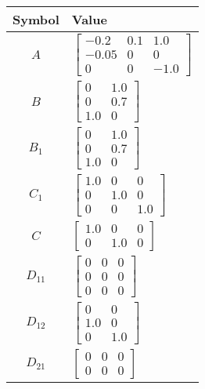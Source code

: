 \begin{tabular}{cl}
\hline
  Symbol  & Value                                                                                  \\
\hline
   $A$    & $\left[\begin{matrix}-0.2 & 0.1 & 1.0\\-0.05 & 0 & 0\\0 & 0 & -1.0\end{matrix}\right]$ \\
   $B$    & $\left[\begin{matrix}0 & 1.0\\0 & 0.7\\1.0 & 0\end{matrix}\right]$                     \\
 $B_{1}$  & $\left[\begin{matrix}0 & 1.0\\0 & 0.7\\1.0 & 0\end{matrix}\right]$                     \\
 $C_{1}$  & $\left[\begin{matrix}1.0 & 0 & 0\\0 & 1.0 & 0\\0 & 0 & 1.0\end{matrix}\right]$         \\
   $C$    & $\left[\begin{matrix}1.0 & 0 & 0\\0 & 1.0 & 0\end{matrix}\right]$                      \\
 $D_{11}$ & $\left[\begin{matrix}0 & 0 & 0\\0 & 0 & 0\\0 & 0 & 0\end{matrix}\right]$               \\
 $D_{12}$ & $\left[\begin{matrix}0 & 0\\1.0 & 0\\0 & 1.0\end{matrix}\right]$                       \\
 $D_{21}$ & $\left[\begin{matrix}0 & 0 & 0\\0 & 0 & 0\end{matrix}\right]$                          \\
\hline
\end{tabular}